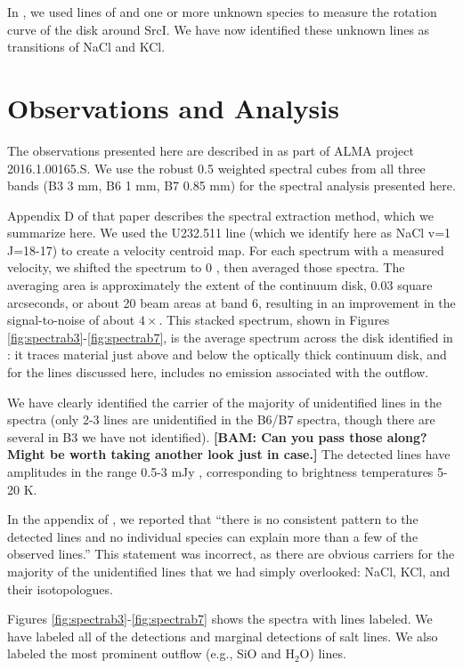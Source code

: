 \documentclass[twocolumn]{aastex62}
\newcommand{\sourcei}{SrcI\xspace}
\newcommand{\bam}[1]{\textcolor{green!65!black}{\textbf{[BAM: #1]}}}
\begin{document}
In \citet[][the brine paper]{Ginsburg2018b}, we used lines of \water and one or
more unknown species to measure the rotation curve of the disk around \sourcei.
We have now identified these unknown lines as transitions of NaCl and KCl.

\section{Observations and Analysis}
The observations presented here are described in \citet{Ginsburg2018b} as part
of ALMA project 2016.1.00165.S.  We use the robust 0.5 weighted spectral cubes
from all three bands (B3 3 mm, B6 1 mm, B7 0.85 mm) for the spectral analysis
presented here.

Appendix D of that paper describes the spectral extraction method,
which we summarize here.  We used the U232.511 line (which we identify here as
NaCl v=1 J=18-17) to create a velocity centroid map.  For each spectrum with
a measured velocity, we shifted the spectrum to 0 \kms, then averaged those
spectra.  The averaging area is approximately the extent of the continuum
disk, 0.03 square arcseconds, or about 20 beam areas at band 6, resulting
in an improvement in the signal-to-noise of about $4\times$.
This stacked spectrum, shown in Figures \ref{fig:spectrab3}-\ref{fig:spectrab7},
is the average spectrum across the disk identified in \citet{Ginsburg2018b}:
it traces material just above and below the optically thick continuum disk, and
for the lines discussed here, includes no emission associated with the outflow.


We have clearly identified the carrier of the majority of unidentified lines in
the \citet{Ginsburg2018b} spectra (only 2-3 lines are unidentified in the B6/B7
spectra, though there are several in B3 we have not identified). \bam{Can you
pass those along?  Might be worth taking another look just in case.}  The
detected lines have amplitudes in the range 0.5-3 mJy \perbeam, corresponding
to brightness temperatures 5-20 K.

In the appendix of \citet{Ginsburg2018b}, we reported that ``there is no
consistent pattern to the detected lines and no individual species can explain
more than a few of the observed lines.''  This statement was incorrect, as
there are obvious carriers for the majority of the unidentified lines that we
had simply overlooked: NaCl, KCl, and their isotopologues.

Figures \ref{fig:spectrab3}-\ref{fig:spectrab7} shows the spectra with lines labeled.  We have labeled all of the
detections and marginal detections of salt lines.  We also labeled the most
prominent outflow (e.g., SiO and H$_2$O) lines.
\end{document}
